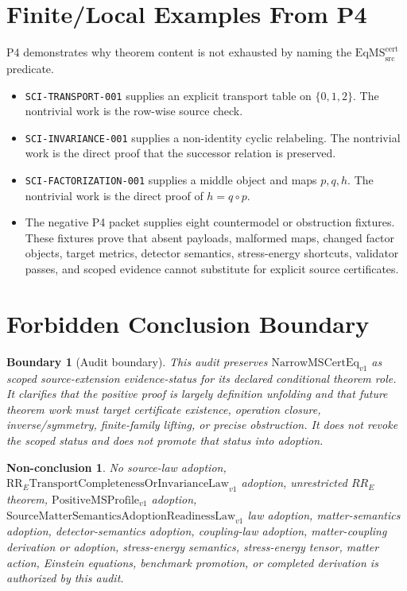 \documentclass[11pt]{article}
\newcommand{\EqMScert}{\mathrm{EqMS}^{\mathrm{cert}}_{\mathrm{src}}}
\newcommand{\NarrowMSCertEq}{\mathrm{NarrowMSCertEq}_{v1}}
\newcommand{\RRELaw}{\mathrm{RR}_{E}\mathrm{TransportCompletenessOrInvarianceLaw}_{v1}}
\newcommand{\PositiveMSProfile}{\mathrm{PositiveMSProfile}_{v1}}
\newcommand{\SMSAR}{\mathrm{SourceMatterSemanticsAdoptionReadinessLaw}_{v1}}
\newtheorem{boundary}{Boundary}
\newtheorem{nonconclusion}{Non-conclusion}
\begin{document}
\section{Finite/Local Examples From P4}

P4 demonstrates why theorem content is not exhausted by naming the
\(\EqMScert\) predicate.

\begin{itemize}[leftmargin=*]
  \item \texttt{SCI-TRANSPORT-001} supplies an explicit transport table on
  \(\{0,1,2\}\). The nontrivial work is the row-wise source check.
  \item \texttt{SCI-INVARIANCE-001} supplies a non-identity cyclic relabeling.
  The nontrivial work is the direct proof that the successor relation is
  preserved.
  \item \texttt{SCI-FACTORIZATION-001} supplies a middle object and maps
  \(p,q,h\). The nontrivial work is the direct proof of \(h=q\circ p\).
  \item The negative P4 packet supplies eight countermodel or obstruction
  fixtures. These fixtures prove that absent payloads, malformed maps, changed
  factor objects, target metrics, detector semantics, stress-energy shortcuts,
  validator passes, and scoped evidence cannot substitute for explicit source
  certificates.
\end{itemize}

\section{Forbidden Conclusion Boundary}

\begin{boundary}[Audit boundary]
This audit preserves \(\NarrowMSCertEq\) as scoped source-extension
evidence-status for its declared conditional theorem role. It clarifies that
the positive proof is largely definition unfolding and that future theorem
work must target certificate existence, operation closure, inverse/symmetry,
finite-family lifting, or precise obstruction. It does not revoke the scoped
status and does not promote that status into adoption.
\end{boundary}

\begin{nonconclusion}
No source-law adoption, \(\RRELaw\) adoption, unrestricted \(RR_E\) theorem,
\(\PositiveMSProfile\) adoption, \(\SMSAR\) law adoption, matter-semantics
adoption, detector-semantics adoption, coupling-law adoption, matter-coupling
derivation or adoption, stress-energy semantics, stress-energy tensor, matter
action, Einstein equations, benchmark promotion, or completed derivation is
authorized by this audit.
\end{nonconclusion}
\end{document}
